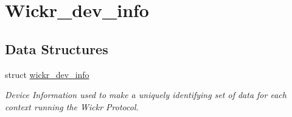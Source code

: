 \hypertarget{group__wickr__dev__info}{}\section{Wickr\+\_\+dev\+\_\+info}
\label{group__wickr__dev__info}
\subsection*{Data Structures}
\begin{DoxyCompactItemize}
\item 
struct \mbox{\hyperlink{structwickr__dev__info}{wickr\+\_\+dev\+\_\+info}}
\begin{DoxyCompactList}\small\item\em Device Information used to make a uniquely identifying set of data for each context running the Wickr Protocol. \end{DoxyCompactList}\end{DoxyCompactItemize}
